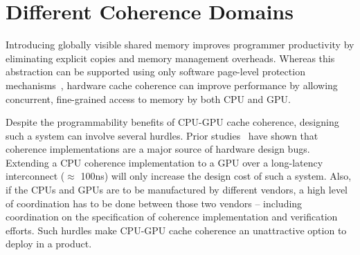 \section{Different Coherence Domains}
Introducing globally visible shared memory improves programmer productivity by
eliminating explicit copies and memory management overheads. Whereas this
abstraction can be supported using only software page-level protection
mechanisms~\cite{UVM, HSA}, hardware cache coherence can improve performance by
allowing concurrent, fine-grained access to memory by both CPU and GPU.


Despite the programmability benefits of CPU-GPU cache coherence, designing such
a system can involve several hurdles. Prior studies~\cite{Hong2012} have shown
that coherence implementations are a major source of hardware design bugs.
Extending a CPU coherence implementation to a GPU over a long-latency
interconnect ($\approx$ 100ns)  will only increase the design cost of such a system.
Also, if the CPUs and GPUs are to be manufactured by different vendors, a high
level of coordination has to be done between those two vendors -- including
coordination on the specification of coherence implementation and verification
efforts. Such hurdles make CPU-GPU cache coherence an unattractive option to
deploy in a product.

